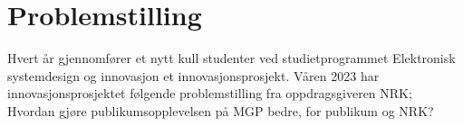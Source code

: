 
\section{Problemstilling}
\label{sec:problemstilling}

Hvert år gjennomfører et nytt kull studenter ved studietprogrammet Elektronisk systemdesign og innovasjon et innovasjonsprosjekt. Våren 2023 har innovasjonsprosjektet følgende problemstilling fra oppdragsgiveren NRK; 
Hvordan gjøre publikumsopplevelsen på MGP bedre, for publikum og NRK?
